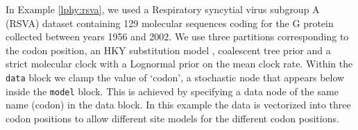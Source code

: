 \documentclass[10pt,letterpaper,table]{article}
\theoremstyle{definition}
\begin{document}
In Example \ref{lphy:rsva}, we used a Respiratory syncytial virus subgroup A (RSVA) dataset \cite{zlateva2004molecular, zlateva2005genetic} containing 129 molecular sequences coding for the G protein collected between years 1956 and 2002. 
We use three partitions corresponding to the codon position, an HKY substitution model \cite{hasegawa1985dating}, coalescent tree prior \cite{kingman82} and a strict molecular clock with a Lognormal prior on the mean clock rate. 
Within the \texttt{data} block we clamp the value of `codon', a stochastic node that appears below inside the \texttt{model} block. 
This is achieved by specifying a data node of the same name (codon) in the data block. 
In this example the data is vectorized into three codon positions to allow different site models for the different codon positions.


\end{document}
